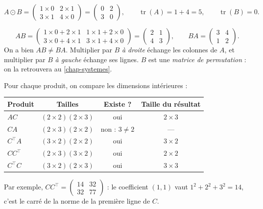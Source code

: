 \begin{example}
\[
    A \odot B =
    \begin{pmatrix} 1 \times 0 & 2 \times 1 \\ 3 \times 1 & 4 \times 0 \end{pmatrix}
    = \begin{pmatrix} 0 & 2 \\ 3 & 0 \end{pmatrix},
    \qquad
    \operatorname{tr}(A) = 1 + 4 = 5,
    \qquad
    \operatorname{tr}(B) = 0.
\]
\end{example}

\begin{example}
\[
    AB =
    \begin{pmatrix}
        1 \times 0 + 2 \times 1 & 1 \times 1 + 2 \times 0 \\
        3 \times 0 + 4 \times 1 & 3 \times 1 + 4 \times 0
    \end{pmatrix}
    = \begin{pmatrix} 2 & 1 \\ 4 & 3 \end{pmatrix},
    \qquad
    BA = \begin{pmatrix} 3 & 4 \\ 1 & 2 \end{pmatrix}.
\]
On a bien $AB \neq BA$. Multiplier par $B$
\emph{à droite} échange les colonnes de $A$, et
multiplier par $B$ \emph{à gauche} échange ses
lignes. $B$ est une \emph{matrice de permutation} :
on la retrouvera au \cref{chap-systemes}.
\end{example}

\begin{example}
Pour chaque produit, on compare les dimensions
intérieures :
\begin{center}
\begin{tabular}{@{}lccc@{}}
    \toprule
    Produit & Tailles & Existe ? & Taille du résultat \\
    \midrule
    $AC$ & $(2 \times 2)(2 \times 3)$ & oui & $2 \times 3$ \\
    $CA$ & $(2 \times 3)(2 \times 2)$ & non : $3 \neq 2$ & --- \\
    $C^\top A$ & $(3 \times 2)(2 \times 2)$ & oui & $3 \times 2$ \\
    $C C^\top$ & $(2 \times 3)(3 \times 2)$ & oui & $2 \times 2$ \\
    $C^\top C$ & $(3 \times 2)(2 \times 3)$ & oui & $3 \times 3$ \\
    \bottomrule
\end{tabular}
\end{center}
Par exemple,
$C C^\top = \begin{pmatrix} 14 & 32 \\ 32 & 77 \end{pmatrix}$ :
le coefficient $(1, 1)$ vaut
$1^2 + 2^2 + 3^2 = 14$, c'est le carré de la norme de
la première ligne de $C$.
\end{example}

